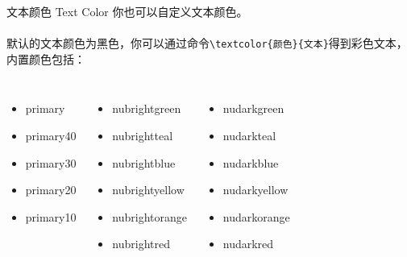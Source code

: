 \documentclass[10pt,aspectratio=169,fontset=none]{ctexbeamer}
\begin{document}
    \begin{frame}{文本颜色 Text Color}
        你也可以自定义文本颜色。
        \\ ~ \\
        默认的文本颜色为黑色，你可以通过命令\texttt{\textcolor{primary}{\textbackslash textcolor}\{颜色\}\{文本\}}得到彩色文本，内置颜色包括：
        \begin{columns}
            \begin{itemize}
                \item[$\textcolor{primary}{\bullet}$] \textcolor{primary}{primary} 
                \item[$\textcolor{primary40}{\bullet}$] \textcolor{primary40}{primary40}
                \item[$\textcolor{primary30}{\bullet}$] \textcolor{primary30}{primary30}
                \item[$\textcolor{primary20}{\bullet}$] \textcolor{primary20}{primary20}
                \item[$\textcolor{primary10}{\bullet}$] \textcolor{primary10}{primary10}
            \end{itemize}
            \begin{itemize}
                \item[$\textcolor{nubrightgreen}{\bullet}$] \textcolor{nubrightgreen}{nubrightgreen}
                \item[$\textcolor{nubrightteal}{\bullet}$] \textcolor{nubrightteal}{nubrightteal}
                \item[$\textcolor{nubrightblue}{\bullet}$] \textcolor{nubrightblue}{nubrightblue}
                \item[$\textcolor{nubrightyellow}{\bullet}$] \textcolor{nubrightyellow}{nubrightyellow}
                \item[$\textcolor{nubrightorange}{\bullet}$] \textcolor{nubrightorange}{nubrightorange}
                \item[$\textcolor{nubrightred}{\bullet}$] \textcolor{nubrightred}{nubrightred}
            \end{itemize}
            \begin{itemize}
                \item[$\textcolor{nudarkgreen}{\bullet}$] \textcolor{nudarkgreen}{nudarkgreen}
                \item[$\textcolor{nudarkteal}{\bullet}$] \textcolor{nudarkteal}{nudarkteal}
                \item[$\textcolor{nudarkblue}{\bullet}$] \textcolor{nudarkblue}{nudarkblue}
                \item[$\textcolor{nudarkyellow}{\bullet}$] \textcolor{nudarkyellow}{nudarkyellow}
                \item[$\textcolor{nudarkorange}{\bullet}$] \textcolor{nudarkorange}{nudarkorange}
                \item[$\textcolor{nudarkred}{\bullet}$] \textcolor{nudarkred}{nudarkred}
            \end{itemize}
        \end{columns}
    \end{frame}
\end{document}
